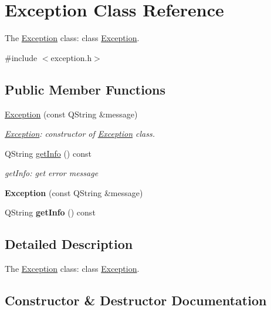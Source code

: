 \hypertarget{class_exception}{}\section{Exception Class Reference}
\label{class_exception}


The \hyperlink{class_exception}{Exception} class\+: class \hyperlink{class_exception}{Exception}.  




{\ttfamily \#include $<$exception.\+h$>$}

\subsection*{Public Member Functions}
\begin{DoxyCompactItemize}
\item 
\hyperlink{class_exception_a18a14655c6ee2ab95dae815ccf1d370a}{Exception} (const Q\+String \&message)
\begin{DoxyCompactList}\small\item\em \hyperlink{class_exception}{Exception}\+: constructor of \hyperlink{class_exception}{Exception} class. \end{DoxyCompactList}\item 
Q\+String \hyperlink{class_exception_af29b1b72e34afe4a37c676200f37950b}{get\+Info} () const
\begin{DoxyCompactList}\small\item\em get\+Info\+: get error message \end{DoxyCompactList}\item 
\mbox{\label{class_exception_a18a14655c6ee2ab95dae815ccf1d370a}} 
{\bfseries Exception} (const Q\+String \&message)
\item 
\mbox{\label{class_exception_af29b1b72e34afe4a37c676200f37950b}} 
Q\+String {\bfseries get\+Info} () const
\end{DoxyCompactItemize}


\subsection{Detailed Description}
The \hyperlink{class_exception}{Exception} class\+: class \hyperlink{class_exception}{Exception}. 

\subsection{Constructor \& Destructor Documentation}
\mbox{\label{class_exception_a18a14655c6ee2ab95dae815ccf1d370a}} 

